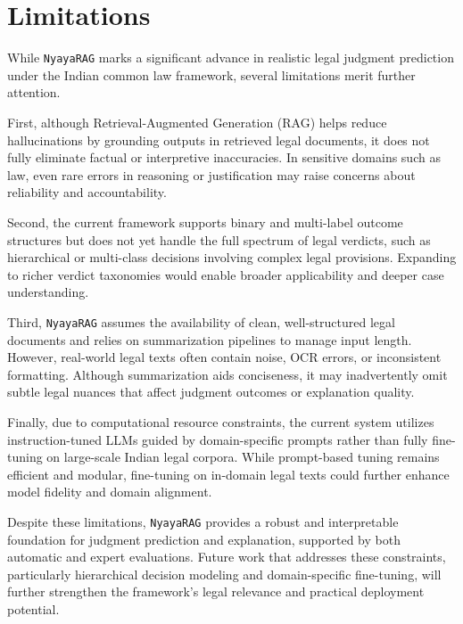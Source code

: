 \section*{Limitations}
\label{sec:limitations}

While \texttt{NyayaRAG} marks a significant advance in realistic legal judgment prediction under the Indian common law framework, several limitations merit further attention.

First, although Retrieval-Augmented Generation (RAG) helps reduce hallucinations by grounding outputs in retrieved legal documents, it does not fully eliminate factual or interpretive inaccuracies. In sensitive domains such as law, even rare errors in reasoning or justification may raise concerns about reliability and accountability.

Second, the current framework supports binary and multi-label outcome structures but does not yet handle the full spectrum of legal verdicts, such as hierarchical or multi-class decisions involving complex legal provisions. Expanding to richer verdict taxonomies would enable broader applicability and deeper case understanding.

Third, \texttt{NyayaRAG} assumes the availability of clean, well-structured legal documents and relies on summarization pipelines to manage input length. However, real-world legal texts often contain noise, OCR errors, or inconsistent formatting. Although summarization aids conciseness, it may inadvertently omit subtle legal nuances that affect judgment outcomes or explanation quality.

Finally, due to computational resource constraints, the current system utilizes instruction-tuned LLMs guided by domain-specific prompts rather than fully fine-tuning on large-scale Indian legal corpora. While prompt-based tuning remains efficient and modular, fine-tuning on in-domain legal texts could further enhance model fidelity and domain alignment.

Despite these limitations, \texttt{NyayaRAG} provides a robust and interpretable foundation for judgment prediction and explanation, supported by both automatic and expert evaluations. Future work that addresses these constraints, particularly hierarchical decision modeling and domain-specific fine-tuning, will further strengthen the framework’s legal relevance and practical deployment potential.
